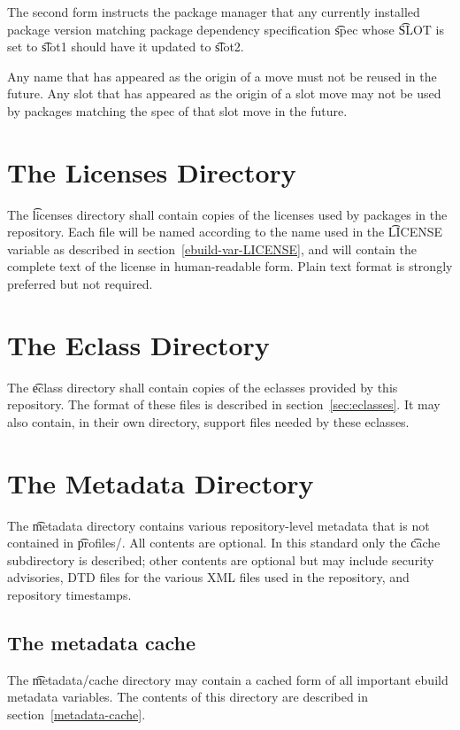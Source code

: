 The second form instructs the package manager that any currently installed package version matching
package dependency specification \t{spec} whose \t{SLOT} is set to \t{slot1} should have it updated
to \t{slot2}.

Any name that has appeared as the origin of a move must not be reused in the future. Any slot
that has appeared as the origin of a slot move may not be used by packages matching the spec of
that slot move in the future.

\section{The Licenses Directory}
\label{sec:licenses-dir}

The \t{licenses} directory shall contain copies of the licenses used by packages in the
repository. Each file will be named according to the name used in the \t{LICENSE} variable as
described in section~\ref{ebuild-var-LICENSE}, and will contain the complete text of the license in
human-readable form. Plain text format is strongly preferred but not required.

\section{The Eclass Directory}
\label{sec:eclass-dir}

The \t{eclass} directory shall contain copies of the eclasses provided by this repository. The
format of these files is described in section~\ref{sec:eclasses}. It may also contain, in their own
directory, support files needed by these eclasses.

\section{The Metadata Directory}
\label{sec:metadata-dir}

The \t{metadata} directory contains various repository-level metadata that is not contained in
\t{profiles/}. All contents are optional. In this standard only the \t{cache} subdirectory is
described; other contents are optional but may include security advisories, DTD files for the
various XML files used in the repository, and repository timestamps.

\subsection{The metadata cache}

The \t{metadata/cache} directory may contain a cached form of all important ebuild metadata
variables. The contents of this directory are described in section~\ref{metadata-cache}.


